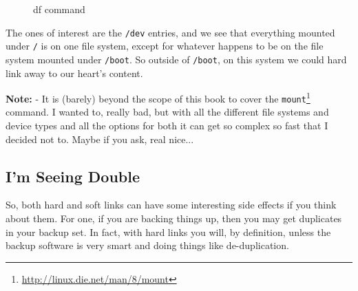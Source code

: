 \documentclass[10pt,american,]{book}
\makeatletter
\newenvironment{Shaded}{\begin{snugshade}}{\end{snugshade}}
\newcommand{\KeywordTok}[1]{\textcolor[rgb]{0.13,0.29,0.53}{\textbf{{#1}}}}
\newcommand{\NormalTok}[1]{{#1}}
\renewcommand{\href}[2]{#2\footnote{\url{#1}}}
\numberwithin{figure}{chapter}
\DeclareRobustCommand{\drcap}[1]{\begin{figure}[H]\caption{#1}\end{figure}}
\DeclareRobustCommand{\drcmd}[1]{\index{Commands!#1@\texttt{#1}}}
\renewcommand{\KeywordTok}[1]{{#1}}
\renewcommand{\NormalTok}[1]{{#1}}
\makeatother
\begin{document}
\drcap{df command}

\begin{Shaded}
\end{Shaded}

The ones of interest are the \texttt{/dev} entries, and we see that
everything mounted under \texttt{/} is on one file system, except for
whatever happens to be on the file system mounted under \texttt{/boot}.
So outside of \texttt{/boot}, on this system we could hard link away to
our heart's content.

\textbf{Note:} - It is (barely) beyond the scope of this book to cover
the \href{http://linux.die.net/man/8/mount}{\texttt{mount}}\drcmd{mount}
command. I wanted to, really bad, but with all the different file
systems and device types and all the options for both it can get so
complex so fast that I decided not to. Maybe if you ask, real nice...

\subsection*{I'm Seeing Double}\label{im-seeing-double}

So, both hard and soft links can have
some interesting side effects if you think about them. For one, if you
are backing things up, then you may get duplicates in your backup set.
In fact, with hard links you will, by definition, unless the backup
software is very smart and doing things like de-duplication.
\end{document}

